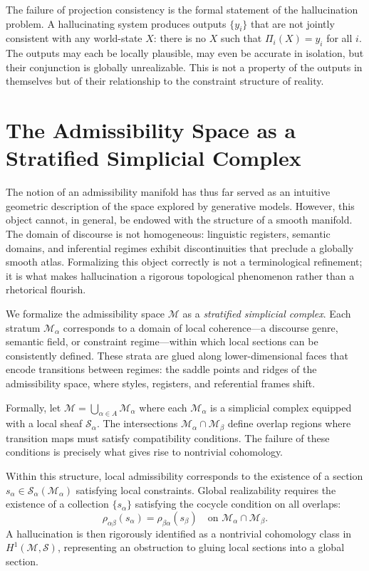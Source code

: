 \documentclass[11pt, oneside]{article}
\begin{document}
The failure of projection consistency is the formal statement of the hallucination problem. A hallucinating system produces outputs $\{y_i\}$ that are not jointly consistent with any world-state $X$: there is no $X$ such that $\Pi_i(X) = y_i$ for all $i$. The outputs may each be locally plausible, may even be accurate in isolation, but their conjunction is globally unrealizable. This is not a property of the outputs in themselves but of their relationship to the constraint structure of reality.

\section{The Admissibility Space as a Stratified Simplicial Complex}

The notion of an admissibility manifold has thus far served as an intuitive geometric description of the space explored by generative models. However, this object cannot, in general, be endowed with the structure of a smooth manifold. The domain of discourse is not homogeneous: linguistic registers, semantic domains, and inferential regimes exhibit discontinuities that preclude a globally smooth atlas. Formalizing this object correctly is not a terminological refinement; it is what makes hallucination a rigorous topological phenomenon rather than a rhetorical flourish.

We formalize the admissibility space $\mathcal{M}$ as a \emph{stratified simplicial complex}. Each stratum $\mathcal{M}_\alpha$ corresponds to a domain of local coherence---a discourse genre, semantic field, or constraint regime---within which local sections can be consistently defined. These strata are glued along lower-dimensional faces that encode transitions between regimes: the saddle points and ridges of the admissibility space, where styles, registers, and referential frames shift.

Formally, let $\mathcal{M} = \bigcup_{\alpha \in A} \mathcal{M}_\alpha$ where each $\mathcal{M}_\alpha$ is a simplicial complex equipped with a local sheaf $\mathcal{S}_\alpha$. The intersections $\mathcal{M}_\alpha \cap \mathcal{M}_\beta$ define overlap regions where transition maps must satisfy compatibility conditions. The failure of these conditions is precisely what gives rise to nontrivial cohomology.

Within this structure, local admissibility corresponds to the existence of a section $s_\alpha \in \mathcal{S}_\alpha(\mathcal{M}_\alpha)$ satisfying local constraints. Global realizability requires the existence of a collection $\{s_\alpha\}$ satisfying the cocycle condition on all overlaps:
\[
\rho_{\alpha\beta}(s_\alpha) = \rho_{\beta\alpha}(s_\beta) \quad \text{on } \mathcal{M}_\alpha \cap \mathcal{M}_\beta.
\]
A hallucination is then rigorously identified as a nontrivial cohomology class in $H^1(\mathcal{M}, \mathcal{S})$, representing an obstruction to gluing local sections into a global section.
\end{document}
